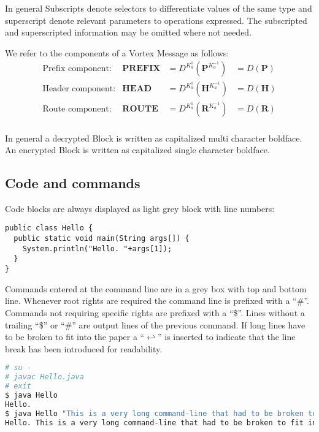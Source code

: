 In general Subscripts denote selectors to differentiate values of the same type and superscript denote relevant parameters to operations expressed. The subscripted and superscripted information may be omitted where not needed.

We refer to the components of a Vortex Message as follows:
\begin{align*}
\text{Prefix component:}         & \mathbf{PREFIX}             	&=D^{K^{1}_a}\left(\mathbf{P}^{K^{-1}_a}\right) &=D\left(\mathbf{P}\right)\\
\text{Header component:}         & \mathbf{HEAD}             	&=D^{K^{1}_a}\left(\mathbf{H}^{K^{-1}_a}\right) &=D\left(\mathbf{H}\right)\\
\text{Route component:}         & \mathbf{ROUTE}             	&=D^{K^{1}_a}\left(\mathbf{R}^{K^{-1}_a}\right) &=D\left(\mathbf{R}\right)\\
\end{align*}

In general a decrypted Block is written as capitalized multi character boldface. An encrypted Block is written as capitalized single character boldface.

\subsection{Code and commands}
Code blocks are always displayed as light grey block with line numbers:

\begin{lstlisting}
public class Hello {
  public static void main(String args[]) {
    System.println("Hello. "+args[1]);
  }
}
\end{lstlisting}

Commands entered at the command line are in a grey box with top and bottom line. Whenever root rights are required the command line is prefixed with a ``\#''. Commands not requiring specific rights are prefixed with a ``\$''. Lines without a trailing ``\$'' or ``\#'' are output lines of the previous command. If long lines have to be broken to fit into the paper a ``$\hookleftarrow$'' is inserted to indicate that the line break has been introduced for readability.

\begin{lstlisting}[language=bash]
# su -
# javac Hello.java 
# exit
$ java Hello
Hello.
$ java Hello "This is a very long command-line that had to be broken to fit into the code box displayed on this page."
Hello. This is a very long command-line that had to be broken to fit into the code box displayed on this page.
\end{lstlisting}


